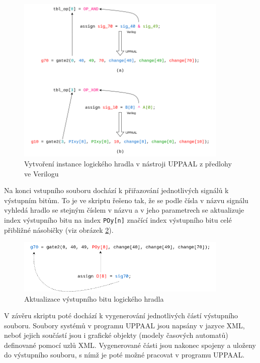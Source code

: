 \begin{figure}[H]
    \centering
    \includegraphics[width=0.9\textwidth]{obrazky-figures/sig_to_gate.png}
    \caption{Vytvoření instance logického hradla v nástroji UPPAAL z předlohy ve Verilogu}
    \label{fig:sig_to_gate}
\end{figure}

Na konci vstupního souboru dochází k přiřazování jednotlivých signálů k výstupním bitům. To je ve skriptu řešeno tak, že se podle čísla v názvu signálu vyhledá hradlo se stejným číslem v názvu a v jeho parametrech se aktualizuje index výstupního bitu na index \texttt{POy[n]} značící index výstupního bitu celé přibližné násobičky (viz obrázek \ref{fig:gate_output}).

\begin{figure}[H]
    \centering
    \includegraphics[width=0.9\textwidth]{obrazky-figures/gate_output.png}
    \caption{Aktualizace výstupního bitu logického hradla}
    \label{fig:gate_output}
\end{figure}

V závěru skriptu poté dochází k vygenerování jednotlivých částí výstupního souboru. Soubory systémů v programu UPPAAL jsou napsány v jazyce XML, neboť jejich součástí jsou i grafické objekty (modely časových automatů) definované pomocí uzlů XML. Vygenerované části jsou nakonec spojeny a uloženy do výstupního souboru, s nímž je poté možné pracovat v programu UPPAAL.

